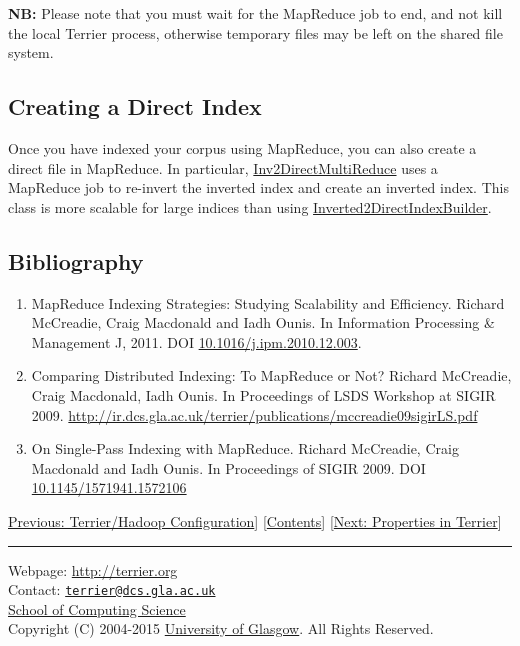 \textbf{NB:} Please note that you must wait for the MapReduce job to
end, and not kill the local Terrier process, otherwise temporary files
may be left on the shared file system.

\subsection{Creating a Direct Index}\label{creating-a-direct-index}

Once you have indexed your corpus using MapReduce, you can also create a
direct file in MapReduce. In particular,
\href{javadoc/org/terrier/structures/indexing/singlepass/hadoop/Inv2DirectMultiReduce.html}{Inv2DirectMultiReduce}
uses a MapReduce job to re-invert the inverted index and create an
inverted index. This class is more scalable for large indices than using
\href{javadoc/org/terrier/structures/indexing/singlepass/Inverted2DirectIndexBuilder.html}{Inverted2DirectIndexBuilder}.

\subsection{Bibliography}\label{bibliography}

\begin{enumerate}
\tightlist
\item
  MapReduce Indexing Strategies: Studying Scalability and Efficiency.
  Richard McCreadie, Craig Macdonald and Iadh Ounis. In Information
  Processing \& Management J, 2011. DOI
  \href{http://dx.doi.org/10.1016/j.ipm.2010.12.003}{10.1016/j.ipm.2010.12.003}.
\item
  Comparing Distributed Indexing: To MapReduce or Not? Richard
  McCreadie, Craig Macdonald, Iadh Ounis. In Proceedings of LSDS
  Workshop at SIGIR 2009.
  \url{http://ir.dcs.gla.ac.uk/terrier/publications/mccreadie09sigirLS.pdf}
\item
  On Single-Pass Indexing with MapReduce. Richard McCreadie, Craig
  Macdonald and Iadh Ounis. In Proceedings of SIGIR 2009. DOI
  \href{http://doi.acm.org/10.1145/1571941.1572106}{10.1145/1571941.1572106}
\end{enumerate}

\href{hadoop_configuration.html}{Previous: Terrier/Hadoop
Configuration}{]} {[}\href{index.html}{Contents}{]}
{[}\href{properties.html}{Next: Properties in Terrier}{]}

\begin{center}\rule{0.5\linewidth}{\linethickness}\end{center}

Webpage: \url{http://terrier.org}\\
Contact:
\href{mailto:terrier@dcs.gla.ac.uk}{\nolinkurl{terrier@dcs.gla.ac.uk}}\\
\href{http://www.dcs.gla.ac.uk/}{School of Computing Science}\\
Copyright (C) 2004-2015 \href{http://www.gla.ac.uk/}{University of
Glasgow}. All Rights Reserved.

~
